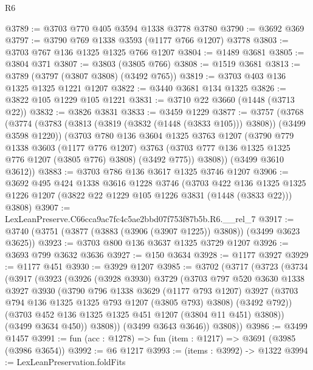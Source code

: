 \begin{lexlean}{R6}
\begin{coremodule}
@3789 := @3703 @770 @405 @3594 @1338 @3778 @3780
@3790 := @3692 @369
@3797 := @3790 @769 @1338 @3593 (@1177 @766 @1207) @3778
@3803 := @3703 @767 @136 @1325 @1325 @766 @1207
@3804 := @1489 @3681
@3805 := @3804 @371
@3807 := @3803 (@3805 @766)
@3808 := @1519 @3681
@3813 := @3789 (@3797 (@3807 @3808) (@3492 @765))
@3819 := @3703 @403 @136 @1325 @1325 @1221 @1207
@3822 := @3440 @3681 @134 @1325
@3826 := @3822 @105 @1229 @105 @1221
@3831 := @3710 @22 @3660 (@1448 (@3713 @22))
@3832 := @3826 @3831
@3833 := @3459 @1229
@3877 := @3757
    (@3768
      (@3774
        (@3783 (@3813 (@3819 (@3832 (@1448 (@3833 @105))) @3808)) (@3499 @3598 @1220))
        (@3703
          @780
          @136
          @3604
          @1325
          @3763
          @1207
          (@3790
            @779
            @1338
            @3603
            (@1177 @776 @1207)
            @3763
            (@3703 @777 @136 @1325 @1325 @776 @1207 (@3805 @776) @3808)
            (@3492 @775))
          @3808))
      (@3499 @3610 @3612))
@3883 := @3703 @786 @136 @3617 @1325 @3746 @1207
@3906 := @3692
    @495
    @424
    @1338
    @3616
    @1228
    @3746
    (@3703
      @422
      @136
      @1325
      @1325
      @1226
      @1207
      (@3822 @22 @1229 @105 @1226 @3831 (@1448 (@3833 @22)))
      @3808)
@3907 := LexLeanPreserve.C66cca9ac7fc4c5ae2bbd07f753f87b5b.R6.__rel_7
@3917 := @3740 (@3751 (@3877 (@3883 (@3906 (@3907 @1225)) @3808)) (@3499 @3623 @3625))
@3923 := @3703 @800 @136 @3637 @1325 @3729 @1207
@3926 := @3693 @799 @3632 @3636
@3927 := @150 @3634
@3928 := @1177 @3927
@3929 := @1177 @451
@3930 := @3929 @1207
@3985 := @3702
    (@3717
      (@3723
        (@3734
          (@3917
            (@3923
              (@3926
                (@3928 @3930)
                @3729
                (@3703
                  @797
                  @520
                  @3630
                  @1338
                  @3927
                  @3930
                  (@3790
                    @796
                    @1338
                    @3629
                    (@1177 @793 @1207)
                    @3927
                    (@3703 @794 @136 @1325 @1325 @793 @1207 (@3805 @793) @3808)
                    (@3492 @792))
                  (@3703 @452 @136 @1325 @1325 @451 @1207 (@3804 @11 @451) @3808))
                (@3499 @3634 @450))
              @3808))
          (@3499 @3643 @3646))
        @3808))
@3986 := @3499 @1457
@3991 := fun (acc : @1278) => fun (item : @1217) => @3691 (@3985 (@3986 @3654))
@3992 := @6 @1217
@3993 := (items : @3992) -> @1322
@3994 := LexLeanPreservation.foldFits

\end{coremodule}
\end{lexlean}
